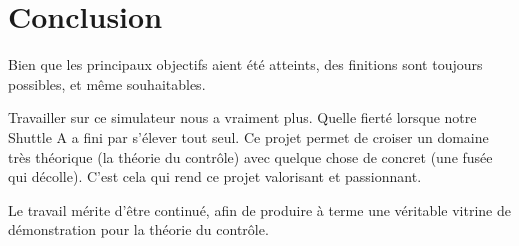 \documentclass[a4paper,11pt]{article}
\begin{document}
\section{Conclusion}
    Bien que les principaux objectifs aient été atteints, des finitions sont toujours possibles, et même souhaitables.
        
    Travailler sur ce simulateur nous a vraiment plus. Quelle fierté lorsque notre Shuttle A a fini par s'élever tout seul. 
    Ce projet permet de croiser un domaine très théorique (la théorie du contrôle) avec quelque chose de concret (une fusée qui décolle). C'est cela qui rend ce projet valorisant et passionnant.
    
    Le travail mérite d'être continué, afin de produire à terme une véritable vitrine de démonstration pour la théorie du contrôle.
\end{document}
